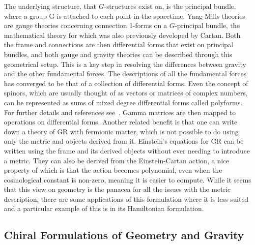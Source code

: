 \documentclass[10pt]{report}
\theoremstyle{definition}
\begin{document}
The underlying structure, that $G$-structures exist on, is the principal bundle, where a group G is attached to each point in the spacetime. Yang-Mills theories are gauge theories concerning connection 1-forms on a $G$-principal bundle, the mathematical theory for which was also previously developed by Cartan. Both the frame and connections are then differential forms that exist on principal bundles, and both gauge and gravity theories can be described through this geometrical setup. This is a key step in resolving the differences between gravity and the other fundamental forces. The descriptions of all the fundamental forces has converged to be that of a collection of differential forms. Even the concept of spinors, which are usually thought of as vectors or matrices of complex numbers, can be represented as sums of mixed degree differential forms called polyforms. For further details and references see~\cite{Notes_on_Spinor_Bhoja_2022}. Gamma matrices are then mapped to operations on differential forms. Another related benefit is that one can write down a theory of GR with fermionic matter, which is not possible to do using only the metric and objects derived from it. Einstein's equations for GR can be written using the frame and its derived objects without ever needing to introduce a metric. They can also be derived from the Einstein-Cartan action, a nice property of which is that the action becomes polynomial, even when the cosmological constant is non-zero, meaning it is easier to compute. While it seems that this view on geometry is the panacea for all the issues with the metric description, there are some applications of this formulation where it is less suited and a particular example of this is in its Hamiltonian formulation.

\subsection*{Chiral Formulations of Geometry and Gravity}
\end{document}

